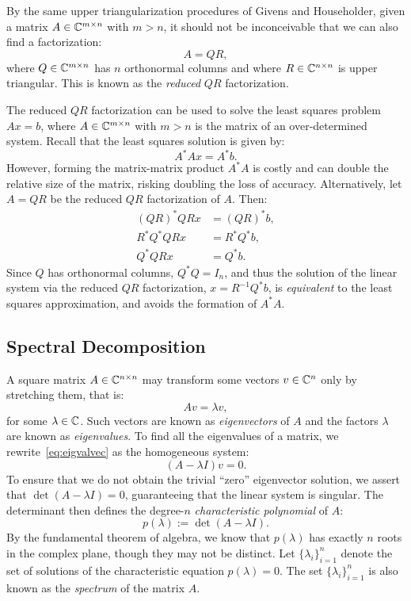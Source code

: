 By the same upper triangularization procedures of Givens and Householder, given a matrix $A\in\mathbb{C}^{m\times n}$ with $m>n$, it should not be inconceivable that we can also find a factorization:
\[
A = QR,
\]
where $Q\in\mathbb{C}^{m\times n}$ has $n$ orthonormal columns and where $R\in\mathbb{C}^{n\times n}$ is upper triangular. This is known as the {\em reduced} $QR$ factorization.

The reduced $QR$ factorization can be used to solve the least squares problem $Ax=b$, where $A\in\mathbb{C}^{m\times n}$ with $m>n$ is the matrix of an over-determined system. Recall that the least squares solution is given by:
\[
A^*Ax = A^*b.
\]
However, forming the matrix-matrix product $A^*A$ is costly and can double the relative size of the matrix, risking doubling the loss of accuracy. Alternatively, let $A=QR$ be the reduced $QR$ factorization of $A$. Then:
\begin{align*}
(QR)^*QRx & = (QR)^*b,\\
R^*Q^*QRx & = R^*Q^*b,\\
Q^*QRx & = Q^*b.
\end{align*}
Since $Q$ has orthonormal columns, $Q^*Q = I_n$, and thus the solution of the linear system via the reduced $QR$ factorization, $x = R^{-1}Q^*b$, is {\em equivalent} to the least squares approximation, and avoids the formation of $A^*A$.

\subsection{Spectral Decomposition}

A square matrix $A\in\mathbb{C}^{n\times n}$ may transform some vectors $v\in\mathbb{C}^n$ only by stretching them, that is:
\begin{equation}\label{eq:eigvalvec}
Av = \lambda v,
\end{equation}
for some $\lambda\in\mathbb{C}$. Such vectors are known as {\em eigenvectors} of $A$ and the factors $\lambda$ are known as {\em eigenvalues}. To find all the eigenvalues of a matrix, we rewrite~\eqref{eq:eigvalvec} as the homogeneous system:
\begin{equation}
(A-\lambda I)v = 0.
\end{equation}
To ensure that we do not obtain the trivial ``zero'' eigenvector solution, we assert that $\det(A-\lambda I)=0$, guaranteeing that the linear system is singular. The determinant then defines the degree-$n$ {\em characteristic polynomial} of $A$:
\[
p(\lambda) := \det(A-\lambda I).
\]
By the fundamental theorem of algebra, we know that $p(\lambda)$ has exactly $n$ roots in the complex plane, though they may not be distinct. Let $\{\lambda_i\}_{i=1}^n$ denote the set of solutions of the characteristic equation $p(\lambda) = 0$. The set $\{\lambda_i\}_{i=1}^n$ is also known as the {\em spectrum} of the matrix $A$.

